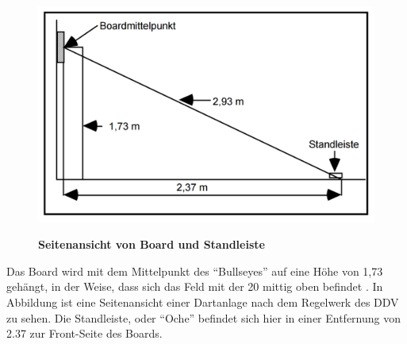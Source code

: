 \begin{figure}
\includegraphics[width=\textwidth]{media/Dartsfield}\\
\caption{\textbf{Seitenansicht von Board und Standleiste 
\cite[8]{DartsRegel2016}}
}
\label{Fig:dartsetup}
\end{figure}


Das Board wird mit dem Mittelpunkt des "`Bullseyes"' auf eine Höhe von 1,73 gehängt, in der Weise, dass sich das Feld mit der 20 mittig oben befindet \autocite[6-8]{DartsRegel2016}. In Abbildung  ist eine Seitenansicht einer Dartanlage nach dem Regelwerk des DDV zu sehen. Die Standleiste, oder "`Oche"' befindet sich hier in einer Entfernung von 2.37 zur Front-Seite des Boards. 

